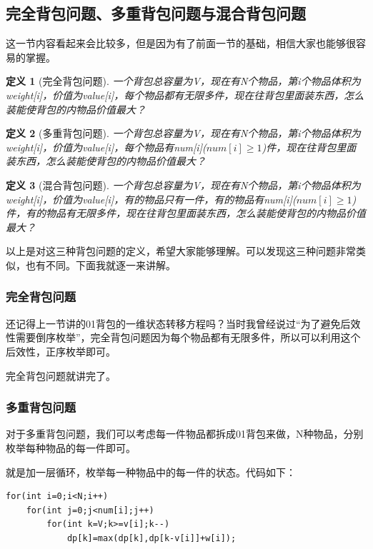\documentclass{article}
\newtheorem{definition}{定义}[subsection]
\theoremstyle{nonumberplain}
\begin{document}
\subsection{完全背包问题、多重背包问题与混合背包问题}
这一节内容看起来会比较多，但是因为有了前面一节的基础，相信大家也能够很容易的掌握。

\begin{definition}[完全背包问题]一个背包总容量为V，现在有N个物品，第i个物品体积为weight[i]，价值为value[i]，每个物品都有无限多件，现在往背包里面装东西，怎么装能使背包的内物品价值最大？\end{definition}

\begin{definition}[多重背包问题]一个背包总容量为V，现在有N个物品，第i个物品体积为weight[i]，价值为value[i]，每个物品有num[i]($num[i]\geq 1$)件，现在往背包里面装东西，怎么装能使背包的内物品价值最大？\end{definition}

\begin{definition}[混合背包问题]一个背包总容量为V，现在有N个物品，第i个物品体积为weight[i]，价值为value[i]，有的物品只有一件，有的物品有num[i]($num[i]\geq 1$)件，有的物品有无限多件，现在往背包里面装东西，怎么装能使背包的内物品价值最大？\end{definition}

以上是对这三种背包问题的定义，希望大家能够理解。可以发现这三种问题非常类似，也有不同。下面我就逐一来讲解。

\subsubsection{完全背包问题}

还记得上一节讲的01背包的一维状态转移方程吗？当时我曾经说过“为了避免后效性需要倒序枚举”，完全背包问题因为每个物品都有无限多件，所以可以利用这个后效性，正序枚举即可。

完全背包问题就讲完了。

\subsubsection{多重背包问题}
对于多重背包问题，我们可以考虑每一件物品都拆成01背包来做，N种物品，分别枚举每种物品的每一件即可。

就是加一层循环，枚举每一种物品中的每一件的状态。代码如下：
\begin{verbatim}
for(int i=0;i<N;i++)
    for(int j=0;j<num[i];j++)
        for(int k=V;k>=v[i];k--) 
            dp[k]=max(dp[k],dp[k-v[i]]+w[i]);
\end{verbatim}
\end{document}
